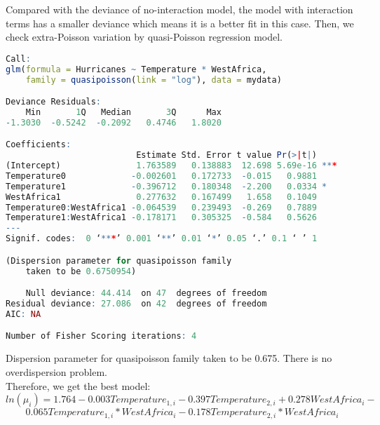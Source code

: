 \documentclass[12pt,a4paper]{article}
\begin{document}
Compared with the deviance of no-interaction model, the model with interaction terms has a smaller deviance which means it is a better ﬁt in this case. Then, we check extra-Poisson variation by quasi-Poisson regression model.
\begin{lstlisting}[language = R]
Call:
glm(formula = Hurricanes ~ Temperature * WestAfrica, 
    family = quasipoisson(link = "log"), data = mydata)

Deviance Residuals: 
    Min       1Q   Median       3Q      Max  
-1.3030  -0.5242  -0.2092   0.4746   1.8020  

Coefficients:
                          Estimate Std. Error t value Pr(>|t|)    
(Intercept)               1.763589   0.138883  12.698 5.69e-16 ***
Temperature0             -0.002601   0.172733  -0.015   0.9881    
Temperature1             -0.396712   0.180348  -2.200   0.0334 *  
WestAfrica1               0.277632   0.167499   1.658   0.1049    
Temperature0:WestAfrica1 -0.064539   0.239493  -0.269   0.7889    
Temperature1:WestAfrica1 -0.178171   0.305325  -0.584   0.5626    
---
Signif. codes:  0 ‘***’ 0.001 ‘**’ 0.01 ‘*’ 0.05 ‘.’ 0.1 ‘ ’ 1

(Dispersion parameter for quasipoisson family 
    taken to be 0.6750954)

    Null deviance: 44.414  on 47  degrees of freedom
Residual deviance: 27.086  on 42  degrees of freedom
AIC: NA

Number of Fisher Scoring iterations: 4
\end{lstlisting}
Dispersion parameter for quasipoisson family taken to be 0.675. There is no overdispersion problem.\\
\newpage
Therefore, we get the best model:
\[ln(\mu_i) = 1.764 - 0.003Temperature_{1 , i} - 0.397Temperature_{2 , i} + 0.278WestAfrica_i -\]
\[0.065Temperature_{1 , i} * WestAfrica_i - 0.178Temperature_{2 , i} * WestAfrica_i\]
\end{document}
